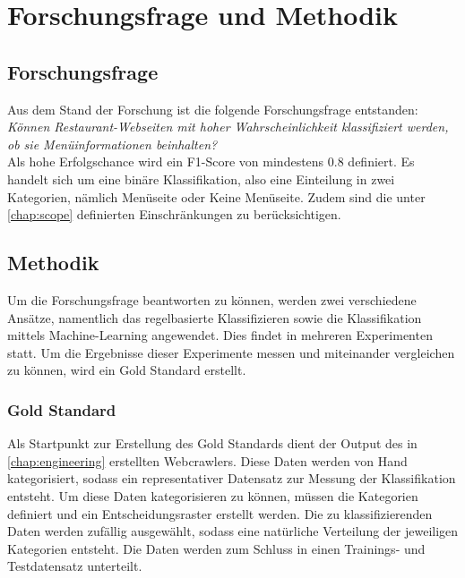 \chapter{Forschungsfrage und Methodik}
\section{Forschungsfrage}
Aus dem Stand der Forschung ist die folgende Forschungsfrage entstanden:\\

\emph{Können Restaurant-Webseiten mit hoher Wahrscheinlichkeit klassifiziert werden, ob sie Menüinformationen beinhalten?}\\

Als hohe Erfolgschance wird ein F1-Score von mindestens 0.8 definiert.
Es handelt sich um eine binäre Klassifikation, also eine Einteilung in zwei Kategorien, nämlich \glqq Menüseite\grqq{} oder \glqq Keine Menüseite\grqq.
Zudem sind die unter \cref{chap:scope} definierten Einschränkungen zu berücksichtigen.
\section{Methodik}
Um die Forschungsfrage beantworten zu können, werden zwei verschiedene Ansätze, namentlich das regelbasierte Klassifizieren sowie die Klassifikation mittels Machine-Learning angewendet.
Dies findet in mehreren Experimenten statt.
Um die Ergebnisse dieser Experimente messen und miteinander vergleichen zu können, wird ein Gold Standard erstellt.
\subsection{Gold Standard}
Als Startpunkt zur Erstellung des Gold Standards dient der Output des in \cref{chap:engineering} erstellten Webcrawlers.
Diese Daten werden von Hand kategorisiert, sodass ein representativer Datensatz zur Messung der Klassifikation entsteht.
Um diese Daten kategorisieren zu können, müssen die Kategorien definiert und ein Entscheidungsraster erstellt werden.
Die zu klassifizierenden Daten werden zufällig ausgewählt, sodass eine natürliche Verteilung der jeweiligen Kategorien entsteht.
Die Daten werden zum Schluss in einen Trainings- und Testdatensatz unterteilt.
